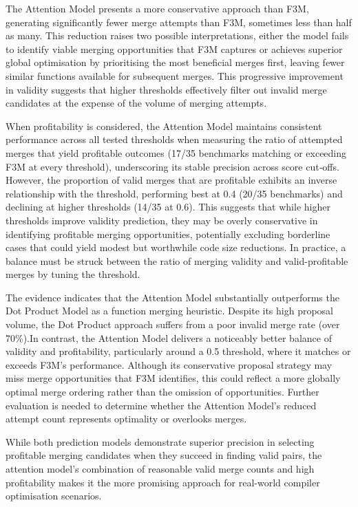 The Attention Model presents a more conservative approach than F3M, generating significantly fewer merge attempts than F3M, sometimes less than half as many. This reduction raises two possible interpretations, either the model fails to identify viable merging opportunities that F3M captures or achieves superior global optimisation by prioritising the most beneficial merges first, leaving fewer similar functions available for subsequent merges. This progressive improvement in validity suggests that higher thresholds effectively filter out invalid merge candidates at the expense of the volume of merging attempts.

When profitability is considered, the Attention Model maintains consistent performance across all tested thresholds when measuring the ratio of attempted merges that yield profitable outcomes (17/35 benchmarks matching or exceeding F3M at every threshold), underscoring its stable precision across score cut‑offs. However, the proportion of valid merges that are profitable exhibits an inverse relationship with the threshold, performing best at 0.4 (20/35 benchmarks) and declining at higher thresholds (14/35 at 0.6). This suggests that while higher thresholds improve validity prediction, they may be overly conservative in identifying profitable merging opportunities, potentially excluding borderline cases that could yield modest but worthwhile code size reductions. In practice, a balance must be struck between the ratio of merging validity and valid-profitable merges by tuning the threshold.

The evidence indicates that the Attention Model substantially outperforms the Dot Product Model as a function merging heuristic. Despite its high proposal volume, the Dot Product approach suffers from a poor invalid merge rate (over 70\%).In contrast, the Attention Model delivers a noticeably better balance of validity and profitability, particularly around a 0.5 threshold, where it matches or exceeds F3M's performance. Although its conservative proposal strategy may miss merge opportunities that F3M identifies, this could reflect a more globally optimal merge ordering rather than the omission of opportunities. Further evaluation is needed to determine whether the Attention Model's reduced attempt count represents optimality or overlooks merges.

While both prediction models demonstrate superior precision in selecting profitable merging candidates when they succeed in finding valid pairs, the attention model's combination of reasonable valid merge counts and high profitability makes it the more promising approach for real-world compiler optimisation scenarios.


